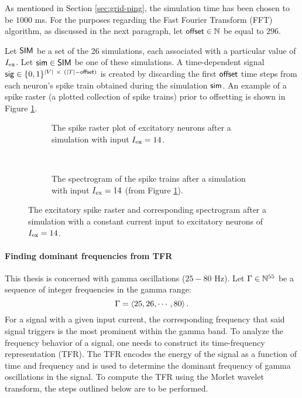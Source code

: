 As mentioned in Section \ref{sec:grid-ping}, the simulation time has been chosen to be $1000$ ms.
For the purposes regarding the Fast Fourier Transform (FFT) algorithm, as discussed in the next paragraph, let $\mathsf{offset} \in \mathbb{N}$ be equal to $296$.

Let $\mathsf{SIM}$ be a set of the 26 simulations, each associated with a particular value of $I_{\mathrm{ex}}$. Let $\mathsf{sim} \in \mathsf{SIM}$ be one of these simulations. A time-dependent signal $\spikesignal \in \{0, 1\} ^ {|V| \ \times \ (|\timesteps| - \offset)}$ is created by discarding the first $\mathsf{offset}$ time steps from each neuron's spike train obtained during the simulation $\mathsf{sim}$. An example of a spike raster (a plotted collection of spike trains) prior to offsetting is shown in Figure \ref{fig:fc14raster}.

\begin{figure}[!htp]
    \centering
    \begin{subfigure}[b]{\textwidth}
        \centering
        
        \vspace{-\baselineskip}
        \caption{The spike raster plot of excitatory neurons after a simulation with input $I_{\mathrm{ex}} = 14$.}
        \label{fig:fc14raster}
    \end{subfigure}
    \\ \vspace{\baselineskip}
    \begin{subfigure}[b]{\textwidth}
        \centering
        
        \caption{The spectrogram of the spike trains after a simulation with input $I_{\mathrm{ex}} = 14$ (from Figure \ref{fig:fc14raster}).}
        \label{fig:fc14tfr}
    \end{subfigure}
    \caption[Spike raster and spectrogram for constant current]{The excitatory spike raster and corresponding spectrogram after a simulation with a constant current input to excitatory neurons of $I_{\mathrm{ex}} = 14$.}
    \label{fig:fc14}
\end{figure}


\paragraph{Finding dominant frequencies from TFR}

This thesis is concerned with gamma oscillations ($25 - 80$ Hz). Let $\Gamma \in \mathbb{N}^{55}$ be a sequence of integer frequencies in the gamma range:
\begin{equation}
    \Gamma = \left<
    25, 26, \cdots, 80
    \right>.
\end{equation}
For a signal with a given input current, the corresponding frequency that said signal triggers is the most prominent within the gamma band. To analyze the frequency behavior of a signal, one needs to construct its time-frequency representation (TFR). 
The TFR encodes the energy of the signal as a function of time and frequency and is used to determine the dominant frequency of gamma oscillations in the signal.
To compute the TFR using the Morlet wavelet transform, the steps outlined below are to be performed.


